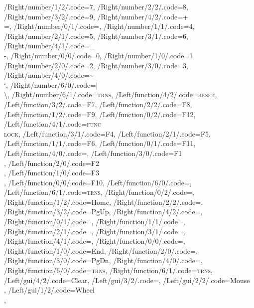 \documentclass[]{article}
\begin{document}
{        /Right/number/1/2/.code=7,
        /Right/number/2/2/.code=8,
        /Right/number/3/2/.code=9,
        /Right/number/4/2/.code=+\\{=},
    /Right/number/0/1/.code=,
        /Right/number/1/1/.code=4,
        /Right/number/2/1/.code=5,
        /Right/number/3/1/.code=6,
        /Right/number/4/1/.code=\_\\-,
    /Right/number/0/0/.code=0,
        /Right/number/1/0/.code=1,
        /Right/number/2/0/.code=2,
        /Right/number/3/0/.code=3,
        /Right/number/4/0/.code=\textasciitilde\\`,
    /Right/number/6/0/.code=|\\\textbackslash,
        /Right/number/6/1/.code=\textsc{trns},
%
%
    /Left/function/4/2/.code=\textsc{reset},
        /Left/function/3/2/.code=F7,
        /Left/function/2/2/.code=F8,
        /Left/function/1/2/.code=F9,
        /Left/function/0/2/.code=F12,
    /Left/function/4/1/.code=\textsc{func}\\\textsc{lock},
        /Left/function/3/1/.code=F4,
        /Left/function/2/1/.code=F5,
        /Left/function/1/1/.code=F6,
        /Left/function/0/1/.code=F11,
    /Left/function/4/0/.code=\shift,
        /Left/function/3/0/.code=F1\\\ctrl,
        /Left/function/2/0/.code=F2\\\Alt,
        /Left/function/1/0/.code=F3\\\cmd,
        /Left/function/0/0/.code=F10,
    /Left/function/6/0/.code=,
        /Left/function/6/1/.code=\textsc{trns},
%
    /Right/function/0/2/.code=\faVolumeUp,
        /Right/function/1/2/.code=Home,
        /Right/function/2/2/.code=\arrowkeyup,
        /Right/function/3/2/.code=PgUp,
        /Right/function/4/2/.code=\faSunO,
    /Right/function/0/1/.code=\faVolumeDown,
        /Right/function/1/1/.code=\arrowkeyleft,
        /Right/function/2/1/.code=\arrowkeydown,
        /Right/function/3/1/.code=\arrowkeyright,
        /Right/function/4/1/.code=\faCircleThin,
    /Right/function/0/0/.code=\faVolumeOff,
        /Right/function/1/0/.code=End,
        /Right/function/2/0/.code=,
        /Right/function/3/0/.code=PgDn,
        /Right/function/4/0/.code=\capslock,
    /Right/function/6/0/.code=\textsc{trns},
        /Right/function/6/1/.code=\textsc{trns},
%
%
    /Left/gui/4/2/.code=\faBluetoothB{}Clear,
        /Left/gui/3/2/.code=,
        /Left/gui/2/2/.code=Mouse\\\arrowkeyup,
        /Left/gui/1/2/.code=Wheel\\\arrowkeyup,
}
\end{document}
